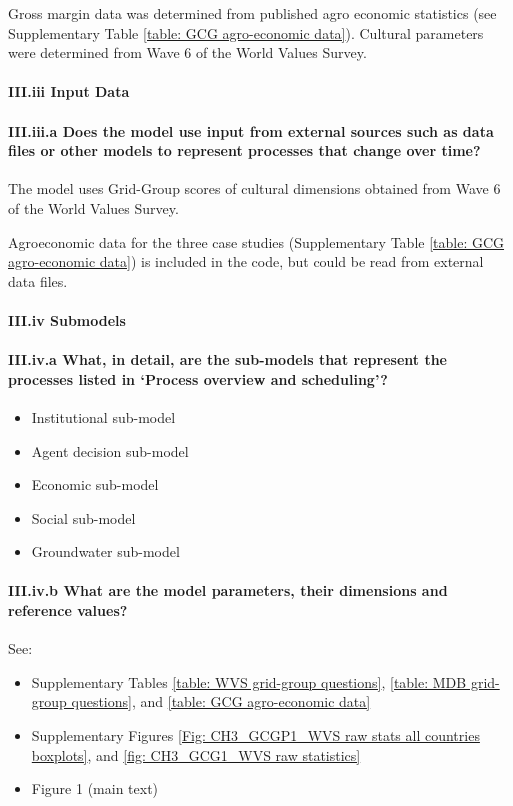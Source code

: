 \documentclass[12pt, a4paper]{article}
\begin{document}
Gross margin data was determined from published agro economic statistics (see Supplementary Table \ref{table: GCG agro-economic data}). Cultural parameters were determined from Wave 6 of the World Values Survey.

\paragraph{III.iii Input Data}

\paragraph{III.iii.a Does the model use input from external sources such as data files or other models to represent processes that change over time?}

The model uses Grid-Group scores of cultural dimensions obtained from Wave 6 of the World Values Survey.

Agroeconomic data for the three case studies (Supplementary Table \ref{table: GCG agro-economic data}) is included in the code, but could be read from external data files.

\paragraph{III.iv Submodels}

\paragraph{III.iv.a What, in detail, are the sub-models that represent the processes listed in `Process overview and scheduling'?}

\begin{itemize} \item Institutional sub-model \item Agent decision sub-model \item Economic sub-model \item Social sub-model \item Groundwater sub-model \end{itemize}

\paragraph{III.iv.b What are the model parameters, their dimensions and reference values?}

See:

\begin{itemize}
	\item Supplementary Tables \ref{table: WVS grid-group questions}, \ref{table: MDB grid-group questions}, and \ref{table: GCG agro-economic data}
	\item Supplementary Figures \ref{Fig: CH3_GCGP1_WVS raw stats all countries boxplots}, and \ref{fig: CH3_GCG1_WVS raw statistics}
	\item Figure 1 (main text)
\end{itemize}
\end{document}
